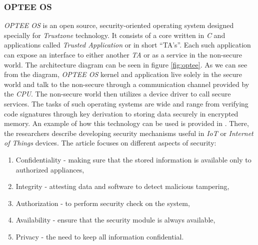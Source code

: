 \subsubsection{OPTEE OS}
\textit{OPTEE OS} is an open source, security-oriented operating system designed specially for \textit{Trustzone} technology. It consists of a core written in \textit{C} and applications called \textit{Trusted Application} or in short “TA's”. Each such application can expose an interface to either another \textit{TA} or as a service in the non-secure world. The architecture diagram can be seen in figure \ref{fig:optee}. As we can see from the diagram, \textit{OPTEE OS} kernel and application live solely in the secure world and talk to the non-secure through a communication channel provided by the \textit{CPU}. The non-secure world then utilizes a device driver to call secure services. The tasks of such operating systems are wide and range from verifying code signatures through key derivation to storing data securely in encrypted memory. An example of how this technology can be used is provided in \cite{opteeusage}. There, the researchers describe developing security mechanisms useful in \textit{IoT} or \textit{Internet of Things} devices. The article focuses on different aspects of security:
\begin{enumerate}
    \item Confidentiality - making sure that the stored information is available only to authorized appliances, 
    \item Integrity - attesting data and software to detect malicious tampering,
    \item Authorization - to perform security check on the system,
    \item Availability - ensure that the security module is always available,
    \item Privacy - the need to keep all information confidential.
\end{enumerate}

